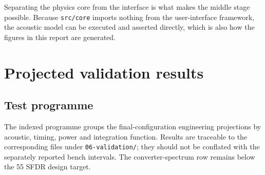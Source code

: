 \documentclass[conference,a4paper]{IEEEtran}
\begin{document}
Separating the physics core from the interface is what makes the middle stage
possible. Because \texttt{src/core} imports nothing from the user-interface
framework, the acoustic model can be executed and asserted directly, which is
also how the figures in this report are generated.

\section{Projected validation results}
\label{sec:validation}

\subsection{Test programme}

The indexed programme groups the final-configuration engineering projections
by acoustic, timing, power and integration function. Results are traceable to
the corresponding files under \texttt{06-validation/}; they should not be
conflated with the separately reported bench intervals. The converter-spectrum
row remains below the \SI{55}{\dBc} SFDR design target.
\end{document}
